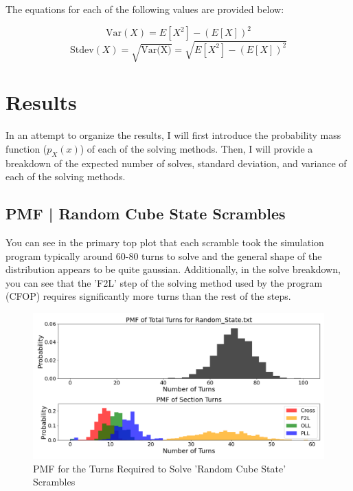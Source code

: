 \documentclass[12pt,letterpaper]{article}
\numberwithin{equation}{section}
\begin{document}
The equations for each of the following values are provided below:

\begin{equation}
\text{Var} \left( X\right)  =E\left[ X^{2}\right]  -\left( E\left[ X\right]  \right)^{2}  
\end{equation}
\begin{equation}
\text{Stdev} \left( X\right)  =\sqrt{\text{Var(X)} } =\sqrt{E\left[ X^{2}\right]  -\left( E\left[ X\right]  \right)^{2}  } 
\end{equation}

\newpage

\section{Results}
In an attempt to organize the results, I will first introduce the probability mass function ($p_X(x)$) of each of the solving methods. Then, I will provide a breakdown of the expected number of solves, standard deviation, and variance of each of the solving methods. 

\subsection{PMF | Random Cube State Scrambles}

You can see in the primary top plot that each scramble took the simulation program typically around 60-80 turns to solve and the general shape of the distribution appears to be quite gaussian. Additionally, in the solve breakdown, you can see that the 'F2L' step of the solving method used by the program (CFOP) requires significantly more turns than the rest of the steps. 

	\begin{figure}[H]
		\centering
		 \includegraphics[width=6in]{Figure_1.png}
		 \caption{PMF for the Turns Required to Solve 'Random Cube State' Scrambles}
		 \label{fig:pmf_random_state_png}
	\end{figure}
	
\end{document}
